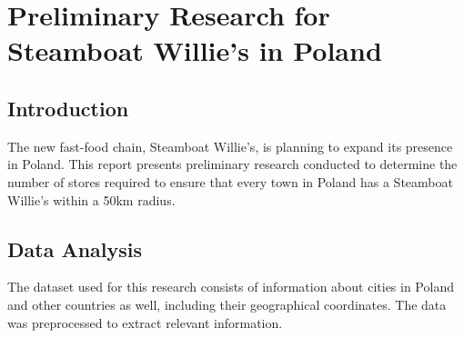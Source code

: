 \chapter{Preliminary Research for Steamboat Willie's in Poland}
\section*{Introduction}
The new fast-food chain, Steamboat Willie's, is planning to expand its presence in Poland. This report presents preliminary research conducted to determine the number of stores required to ensure that every town in Poland has a Steamboat Willie's within a 50km radius.
\section*{Data Analysis}
The dataset used for this research consists of information about cities in Poland and other countries as well, including their geographical coordinates. The data was preprocessed to extract relevant information.

